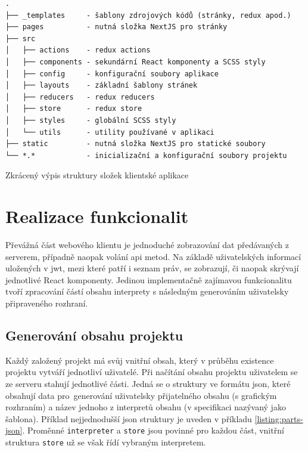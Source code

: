 \begin{fig:code}
	\begin{verbatim}
.
├── _templates     - šablony zdrojových kódů (stránky, redux apod.)
├── pages          - nutná složka NextJS pro stránky
├── src
│   ├── actions    - redux actions
│   ├── components - sekundární React komponenty a SCSS styly
│   ├── config     - konfigurační soubory aplikace
│   ├── layouts    - základní šablony stránek
│   ├── reducers   - redux reducers
│   ├── store      - redux store
│   ├── styles     - globální SCSS styly
│   └── utils      - utility používané v aplikaci
├── static         - nutná složka NextJS pro statické soubory
└── *.*            - inicializační a konfigurační soubory projektu
   \end{verbatim}
   \caption{Zkrácený výpis struktury složek klientské aplikace}\label{folders:client}
\end{fig:code}

   



\section{Realizace funkcionalit}

Převážná část webového klientu je jednoduché zobrazování dat předávaných z serverem, případně naopak volání \gls{api} metod. Na základě uživatelských informací uložených v \gls{jwt}, mezi které patří i seznam práv, se zobrazují, či naopak skrývají jednotlivé React komponenty. Jedinou implementačně zajímavou funkcionalitu tvoří zpracování částí obsahu interprety s následným generováním uživatelsky připraveného rozhraní.


\subsection{Generování obsahu projektu}
Každý založený projekt má svůj vnitřní obsah, který v průběhu existence projektu vytváří jednotliví uživatelé. Při načítání obsahu projektu uživatelem se ze serveru stahují jednotlivé části. Jedná se o struktury ve formátu \gls{json}, které obsahují data pro~generování uživatelsky přijatelného obsahu (s grafickým rozhraním) a název jednoho z interpretů obsahu (v specifikaci nazývaný jako šablona). Příklad nejjednodušší \gls{json} struktury je uveden v příkladu \ref{listing:parts-json}. Proměnné \texttt{interpreter} a \texttt{store} jsou povinné pro každou část, vnitřní struktura \texttt{store} už se však řídí vybraným interpretem. 


